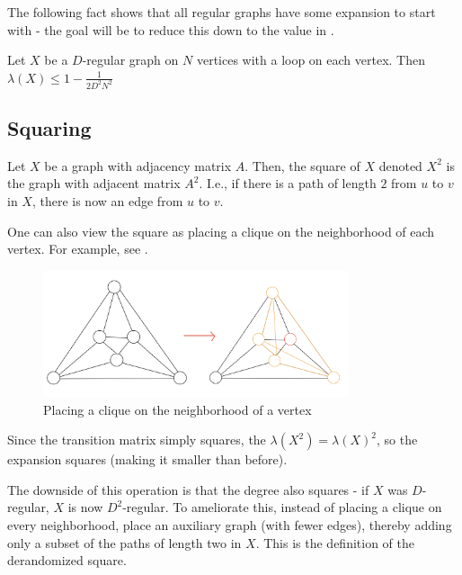 \documentclass{article}
\begin{document}
The following fact shows that all regular graphs have some expansion to start with - the goal will be to reduce this down to the value in .

\begin{lemma}\label{lem:starting-expansion}
    Let $X$ be a $D$-regular graph on $N$ vertices with a loop on each vertex. Then $\lambda(X) \leq 1 - \frac{1}{2D^2N^2}$
\end{lemma}

\subsection{Squaring}

\begin{definition}[Squaring]
    Let $X$ be a graph with adjacency matrix $A$. Then, the square of $X$ denoted $X^2$ is the graph with adjacent matrix $A^2$. I.e., if there is a path of length $2$ from $u$ to $v$ in $X$, there is now an edge from $u$ to $v$.
\end{definition}

\begin{remark}
One can also view the square as placing a clique on the neighborhood of each vertex. For example, see .
\end{remark}

\begin{figure}
    \begin{center}
        \includegraphics[width=0.8\textwidth]{square.png}
    \end{center}
    \caption{Placing a clique on the neighborhood of a vertex}\label{fig:square}
\end{figure}


\begin{remark}
Since the transition matrix simply squares, the $\lambda(X^2) = \lambda(X)^2$, so the expansion squares (making it smaller than before).    
\end{remark}

The downside of this operation is that the degree also squares - if $X$ was $D$-regular, $X$ is now $D^2$-regular. To ameliorate this, instead of placing a clique on every neighborhood, place an auxiliary graph (with fewer edges), thereby adding only a subset of the paths of length two in $X$. This is the definition of the derandomized square.
\end{document}
